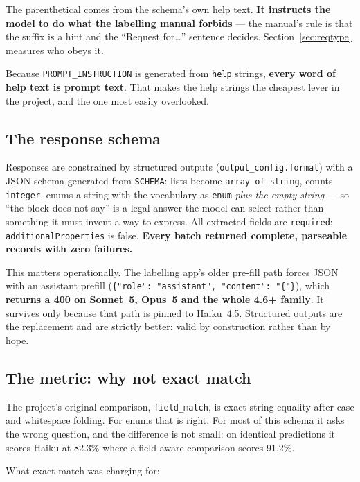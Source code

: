 \documentclass[11pt]{article}
\begin{document}
The parenthetical comes from the schema's own help text. \textbf{It instructs the model to do
what the labelling manual forbids} --- the manual's rule is that the suffix is a hint and the
``Request for\ldots'' sentence decides. Section~\ref{sec:reqtype} measures who obeys it.

Because \texttt{PROMPT\_INSTRUCTION} is generated from \texttt{help} strings, \textbf{every
word of help text is prompt text}. That makes the help strings the cheapest lever in the
project, and the one most easily overlooked.

\subsection{The response schema}

Responses are constrained by structured outputs (\texttt{output\_config.format}) with a JSON
schema generated from \texttt{SCHEMA}: lists become \texttt{array of string}, counts
\texttt{integer}, enums a string with the vocabulary as \texttt{enum} \emph{plus the empty
string} --- so ``the block does not say'' is a legal answer the model can select rather than
something it must invent a way to express. All extracted fields are \texttt{required};
\texttt{additionalProperties} is false. \textbf{Every batch returned complete, parseable
records with zero failures.}

This matters operationally. The labelling app's older pre-fill path forces JSON with an
assistant prefill (\texttt{\{"role": "assistant", "content": "\{"\}}), which \textbf{returns a
400 on Sonnet~5, Opus~5 and the whole 4.6+ family}. It survives only because that path is
pinned to Haiku~4.5. Structured outputs are the replacement and are strictly better: valid by
construction rather than by hope.

\subsection{The metric: why not exact match}
\label{sec:metric}

The project's original comparison, \texttt{field\_match}, is exact string equality after case
and whitespace folding. For enums that is right. For most of this schema it asks the wrong
question, and the difference is not small: on identical predictions it scores Haiku at 82.3\%
where a field-aware comparison scores 91.2\%.

What exact match was charging for:
\end{document}
